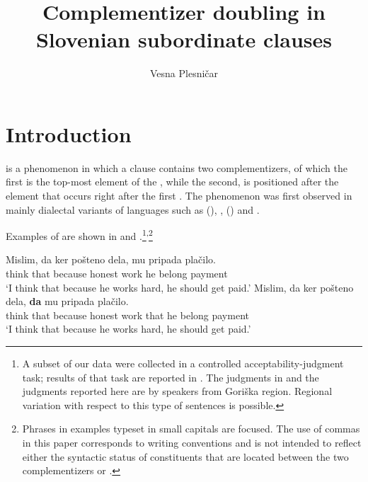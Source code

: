 \documentclass[output=paper,colorlinks,citecolor=brown]{langsci/langscibook}
\author{Vesna Plesničar\affiliation{University of Nova Gorica}}
\title{Complementizer doubling in Slovenian subordinate clauses}
\begin{document}
\maketitle
{}
\section{Introduction}
 is a phenomenon in which a clause contains two complementizers, of which the first is the top-most element of the , while the second,   is positioned after the element that occurs right after the first . The phenomenon was first observed in mainly dialectal variants of  languages such as  (\citealt{Paoli2003, ledgeway2005, munaro2016}),  \citep{dagnac2012},  (\citealt{villa2012, GiP2014}) and  \citep{mascarenhas2007}.

Examples of   are shown in  and .\footnote{A subset of our data were collected in a controlled acceptability-judgment task; results of that task are reported in \cite{plesnicar2016}. The judgments in \cite{plesnicar2016} and the judgments reported here are by  speakers from Goriška region. Regional variation with respect to this type of sentences is possible.}\textsuperscript{,}\footnote{Phrases in examples typeset in small capitals are focused. The use of commas in this paper corresponds to  writing conventions and is not intended to reflect either the syntactic status of constituents that are located between the two complementizers or .}


\begin{exe}
\ex \begin{xlist}\label{ex:plesnicar:1}
\ex \label{ex:plesnicar:onea}\gll Mislim,	da	ker		pošteno	dela, 	mu	pripada plačilo.\\
	think that because	honest		work	he	belong payment \\
\trans `I think that because he works hard, he should get paid.'
\ex \label{ex:plesnicar:oneb}
\gll	Mislim,	da	ker		pošteno	dela,	\textbf{da}	mu 	pripada plačilo. \\
	think that	because	honest	work	that	he	belong payment \\
\trans `I think that because he works hard, he should get paid.'
\end{xlist}\end{exe}
\end{document}
